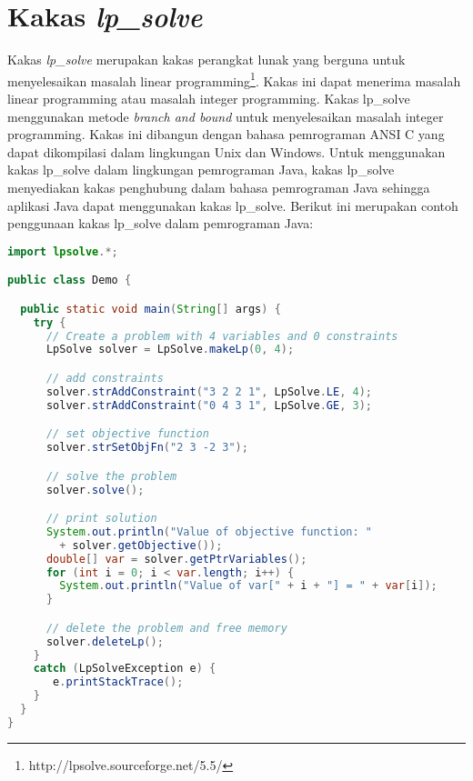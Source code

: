 \section{Kakas \textit{lp{\_}solve}}
Kakas \textit{lp{\_}solve} merupakan kakas perangkat lunak yang berguna untuk menyelesaikan masalah linear programming\footnote{http://lpsolve.sourceforge.net/5.5/}. Kakas ini dapat menerima masalah linear programming atau masalah integer programming. Kakas lp{\_}solve menggunakan metode \textit{branch and bound} untuk menyelesaikan masalah integer programming. Kakas ini dibangun dengan bahasa pemrograman ANSI C yang dapat dikompilasi dalam lingkungan Unix dan Windows. Untuk menggunakan kakas lp{\_}solve dalam lingkungan pemrograman Java, kakas lp{\_}solve menyediakan kakas penghubung dalam bahasa pemrograman Java sehingga aplikasi Java dapat menggunakan kakas lp{\_}solve. Berikut ini merupakan contoh penggunaan kakas lp{\_}solve dalam pemrograman Java:
\begin{lstlisting}[language=Java, caption=Demo.java]
import lpsolve.*;

public class Demo {

  public static void main(String[] args) {
    try {
      // Create a problem with 4 variables and 0 constraints
      LpSolve solver = LpSolve.makeLp(0, 4);

      // add constraints
      solver.strAddConstraint("3 2 2 1", LpSolve.LE, 4);
      solver.strAddConstraint("0 4 3 1", LpSolve.GE, 3);

      // set objective function
      solver.strSetObjFn("2 3 -2 3");

      // solve the problem
      solver.solve();

      // print solution
      System.out.println("Value of objective function: " 
        + solver.getObjective());
      double[] var = solver.getPtrVariables();
      for (int i = 0; i < var.length; i++) {
        System.out.println("Value of var[" + i + "] = " + var[i]);
      }

      // delete the problem and free memory
      solver.deleteLp();
    }
    catch (LpSolveException e) {
       e.printStackTrace();
    }
  }
}
\end{lstlisting}